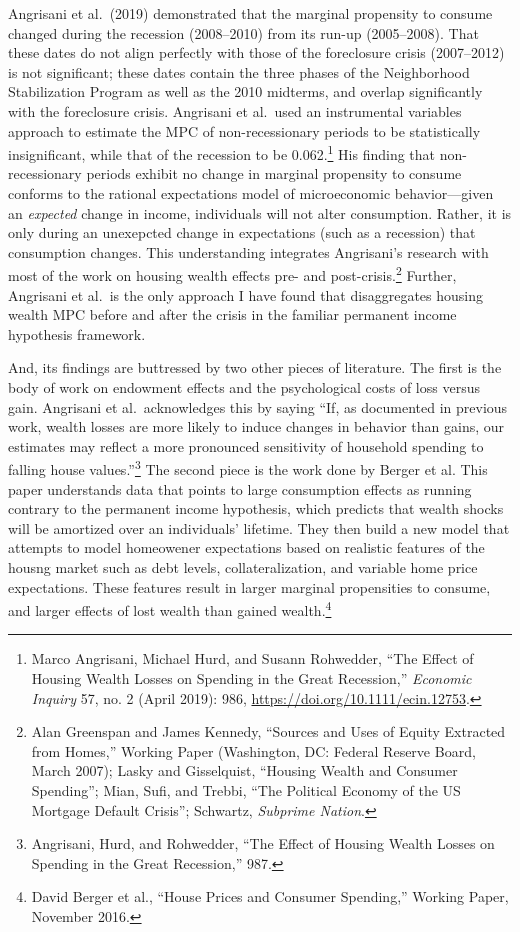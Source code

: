 \documentclass[12pt,oneside]{psthesis}
\begin{document}
Angrisani et al.~(2019) demonstrated that the marginal propensity to consume changed during the recession (2008--2010) from its run-up (2005--2008).
That these dates do not align perfectly with those of the foreclosure crisis (2007--2012) is not significant; these dates contain the three phases of the Neighborhood Stabilization Program as well as the 2010 midterms, and overlap significantly with the foreclosure crisis.
Angrisani et al.~used an instrumental variables approach to estimate the MPC of non-recessionary periods to be statistically insignificant, while that of the recession to be 0.062.\footnote{Marco Angrisani, Michael Hurd, and Susann Rohwedder, ``The Effect of Housing Wealth Losses on Spending in the Great Recession,'' \emph{Economic Inquiry} 57, no. 2 (April 2019): 986, \url{https://doi.org/10.1111/ecin.12753}.}
His finding that non-recessionary periods exhibit no change in marginal propensity to consume conforms to the rational expectations model of microeconomic behavior---given an \emph{expected} change in income, individuals will not alter consumption.
Rather, it is only during an unexepcted change in expectations (such as a recession) that consumption changes.
This understanding integrates Angrisani's research with most of the work on housing wealth effects pre- and post-crisis.\footnote{Alan Greenspan and James Kennedy, ``Sources and Uses of Equity Extracted from Homes,'' Working Paper (Washington, DC: Federal Reserve Board, March 2007); Lasky and Gisselquist, ``Housing Wealth and Consumer Spending''; Mian, Sufi, and Trebbi, ``The Political Economy of the US Mortgage Default Crisis''; Schwartz, \emph{Subprime Nation}.}
Further, Angrisani et al.~is the only approach I have found that disaggregates housing wealth MPC before and after the crisis in the familiar permanent income hypothesis framework.

And, its findings are buttressed by two other pieces of literature.
The first is the body of work on endowment effects and the psychological costs of loss versus gain.
Angrisani et al.~acknowledges this by saying ``If, as documented in previous work, wealth losses are more likely to induce changes in behavior than gains, our estimates may reflect a more pronounced sensitivity of household spending to falling house values.''\footnote{Angrisani, Hurd, and Rohwedder, ``The Effect of Housing Wealth Losses on Spending in the Great Recession,'' 987.}
The second piece is the work done by Berger et al.
This paper understands data that points to large consumption effects as running contrary to the permanent income hypothesis, which predicts that wealth shocks will be amortized over an individuals' lifetime.
They then build a new model that attempts to model homeowener expectations based on realistic features of the housng market such as debt levels, collateralization, and variable home price expectations.
These features result in larger marginal propensities to consume, and larger effects of lost wealth than gained wealth.\footnote{David Berger et al., ``House Prices and Consumer Spending,'' Working Paper, November 2016.}
\end{document}
